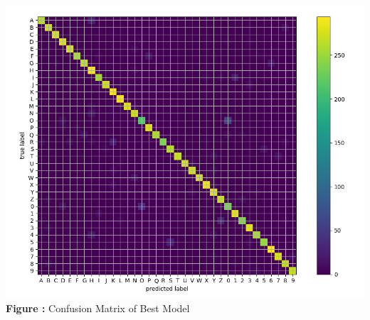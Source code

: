 \documentclass{article}
\begin{document}
\begin{minipage}{1\linewidth}
	\centering
	\hspace{0.12\linewidth} 
	\includegraphics[width=0.7\linewidth]{./Q34_res.png}  %
	\newline
	\textbf{Figure \thefigure:} Confusion Matrix of Best Model %
	\label{fig:Q34_res}  %
\end{minipage}	

	\newpage
\end{document}
